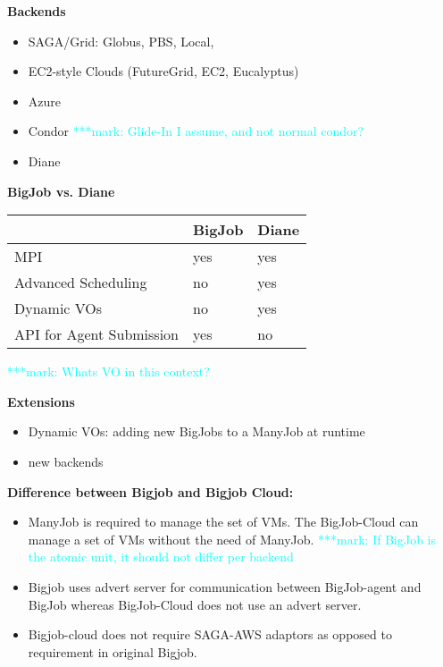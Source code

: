 \documentclass[]{article}
\newcommand{\msnote}[1]{ {\textcolor{cyan} { ***mark: #1 }}}
\begin{document}
\vspace{10 mm}

\textbf{Backends}
\begin{itemize}
    \item SAGA/Grid: Globus, PBS, Local, 
    \item EC2-style Clouds (FutureGrid, EC2, Eucalyptus)
    \item Azure
    \item Condor
    \msnote{Glide-In I assume, and not normal condor?}
    \item Diane
\end{itemize}


\textbf{BigJob vs. Diane}

\begin{tabular}{|l|l|l|}
\hline
 &BigJob &Diane\\
\hline
MPI &yes &yes\\
\hline
Advanced Scheduling &no &yes\\
\hline
Dynamic VOs &no &yes\\
\hline
API for Agent Submission &yes &no\\
\hline
\end{tabular}

\msnote{Whats VO in this context?}





\textbf{Extensions}
\begin{itemize}
    \item Dynamic VOs: adding new BigJobs to a ManyJob at runtime
    \item new backends
\end{itemize}


\textbf{Difference between Bigjob and Bigjob Cloud:} 

\begin{itemize}
	\item ManyJob is required to manage the set of VMs. The BigJob-Cloud can manage a set of VMs without the need of ManyJob.
	\msnote{If BigJob is the atomic unit, it should not differ per backend}
	\item Bigjob uses advert server for communication between BigJob-agent and BigJob whereas BigJob-Cloud does not use an advert server.
	\item Bigjob-cloud does not require SAGA-AWS adaptors as opposed to requirement in original Bigjob. 
\end{itemize}	
\end{document}
